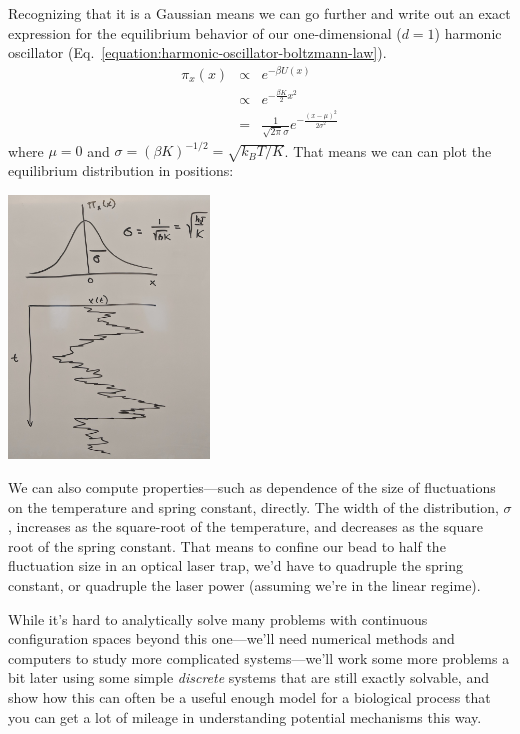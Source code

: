 \documentclass[english,course]{lecture}
\begin{document}
Recognizing that it is a Gaussian means we can go further and write out an exact expression for the equilibrium behavior of our one-dimensional ($d=1$) harmonic oscillator (Eq.~\ref{equation:harmonic-oscillator-boltzmann-law}).
\begin{eqnarray}
\pi_x(x) &\propto& e^{-\beta U(x)} \\
&\propto& e^{-\frac{\beta K}{2} x^2} \\
&=& \frac{1}{\sqrt{2 \pi} \sigma} e^{-\frac{(x - \mu)^2}{2 \sigma^2}}
\end{eqnarray}
where $\mu = 0$ and $\sigma = (\beta K)^{-1/2} = \sqrt{k_B T / K}$.
That means we can can plot the equilibrium distribution in positions:

\begin{centering}
\includegraphics[width=0.4\textwidth]{figures/harmonic-oscillator-trajectory.jpg}

\end{centering}

We can also compute properties---such as dependence of the size of fluctuations on the temperature and spring constant, directly.
The width of the distribution, $\sigma$, increases as the square-root of the temperature, and decreases as the square root of the spring constant.
That means to confine our bead to half the fluctuation size in an optical laser trap, we'd have to quadruple the spring constant, or quadruple the laser power (assuming we're in the linear regime).

While it's hard to analytically solve many problems with continuous configuration spaces beyond this one---we'll need numerical methods and computers to study more complicated systems---we'll work some more problems a bit later using some simple \emph{discrete} systems that are still exactly solvable, and show how this can often be a useful enough model for a biological process that you can get a lot of mileage in understanding potential mechanisms this way.
\end{document}
